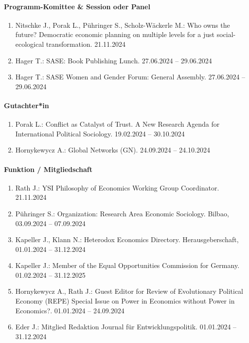 \paragraph{Programm-Komittee \& Session oder Panel}
\begin{enumerate}[leftmargin=*, labelsep=0.5cm]
\item Nitschke J., Porak L., Pühringer S., Scholz-Wäckerle M.: Who owns the future? Democratic economic planning on multiple levels for a just social-ecological transformation. 21.11.2024
\item Hager T.: SASE: Book Publishing Lunch. 27.06.2024 -- 29.06.2024
\item Hager T.: SASE Women and Gender Forum: General Assembly. 27.06.2024 -- 29.06.2024
\end{enumerate}

\paragraph{Gutachter*in}
\begin{enumerate}[leftmargin=*, labelsep=0.5cm]
\item Porak L.: Conflict as Catalyst of Trust. A New Research Agenda for International Political Sociology. 19.02.2024 -- 30.10.2024
\item Hornykewycz A.: Global Networks (GN). 24.09.2024 -- 24.10.2024
\end{enumerate}

\paragraph{Funktion / Mitgliedschaft}
\begin{enumerate}[leftmargin=*, labelsep=0.5cm]
\item Rath J.: YSI Philosophy of Economics Working Group Coordinator. 21.11.2024
\item Pühringer S.: Organization: Research Area Economic Sociology. Bilbao, 03.09.2024 -- 07.09.2024
\item Kapeller J., Klann N.: Heterodox Economics Directory. Herausgeberschaft, 01.01.2024 -- 31.12.2024
\item Kapeller J.: Member of the Equal Opportunities Commission for Germany. 01.02.2024 -- 31.12.2025
\item Hornykewycz A., Rath J.: Guest Editor for Review of Evolutionary Political Economy (REPE) Special Issue on \glqq Power in Economics without Power in Economics?\grqq{}. 01.01.2024 -- 24.09.2024
\item Eder J.: Mitglied Redaktion Journal für Entwicklungspolitik. 01.01.2024 -- 31.12.2024
\end{enumerate}

